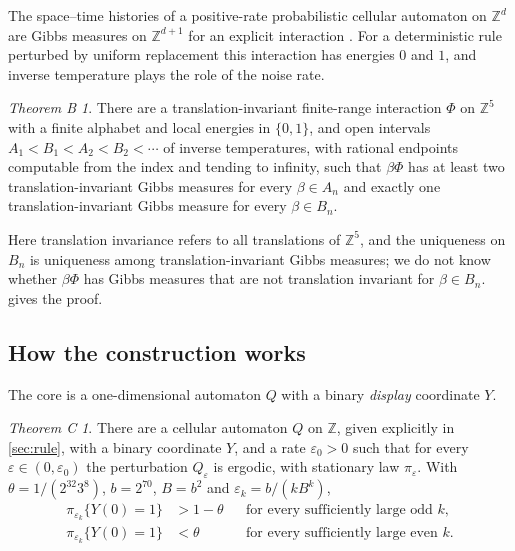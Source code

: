 \documentclass[11pt]{article}
\theoremstyle{plain}
\theoremstyle{definition}
\theoremstyle{remark}
\newtheorem*{mainB}{Theorem B}
\newtheorem*{mainC}{Theorem C}
\newcommand{\Z}{\mathbb Z}
\newcommand{\eps}{\varepsilon}
\begin{document}
The space--time histories of a positive-rate probabilistic cellular automaton on $\Z^d$ are Gibbs measures on $\Z^{d+1}$ for an explicit interaction \cite{GKLM89,LMS90}. For a deterministic rule perturbed by uniform replacement this interaction has energies $0$ and $1$, and inverse temperature plays the role of the noise rate.

\begin{mainB}
There are a translation-invariant finite-range interaction $\Phi$ on $\Z^5$ with a finite alphabet and local energies in $\{0,1\}$, and open intervals $A_1<B_1<A_2<B_2<\cdots$ of inverse temperatures, with rational endpoints computable from the index and tending to infinity, such that $\beta\Phi$ has at least two translation-invariant Gibbs measures for every $\beta\in A_n$ and exactly one translation-invariant Gibbs measure for every $\beta\in B_n$.
\end{mainB}

Here translation invariance refers to all translations of $\Z^5$, and the uniqueness on $B_n$ is uniqueness among translation-invariant Gibbs measures; we do not know whether $\beta\Phi$ has Gibbs measures that are not translation invariant for $\beta\in B_n$.  gives the proof.

\subsection{How the construction works}

The core is a one-dimensional automaton $Q$ with a binary \emph{display} coordinate $Y$.

\begin{mainC}
There are a cellular automaton $Q$ on $\Z$, given explicitly in \cref{sec:rule}, with a binary coordinate $Y$, and a rate $\eps_0>0$ such that for every $\eps\in(0,\eps_0)$ the perturbation $Q_\eps$ is ergodic, with stationary law $\pi_\eps$. With $\theta=1/(2^{32}3^8)$, $b=2^{70}$, $B=b^2$ and $\eps_k=b/(kB^k)$,
\begin{align*}
\pi_{\eps_k}\{Y(0)=1\}&>1-\theta&&\text{for every sufficiently large odd }k,\\
\pi_{\eps_k}\{Y(0)=1\}&<\theta&&\text{for every sufficiently large even }k.
\end{align*}
\end{mainC}
\end{document}
